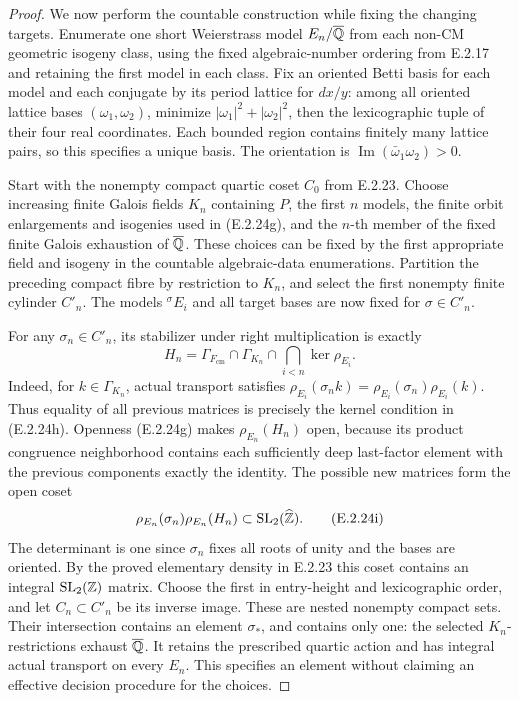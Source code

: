 \begin{proof}
We now perform the countable construction while fixing
the changing targets. Enumerate one short Weierstrass
model \(E_n/\overline{\mathbb Q}\) from each non-CM geometric isogeny
class, using the fixed algebraic-number ordering from
E.2.17 and retaining the first model in each class.
Fix an oriented Betti basis for each model and each
conjugate by its period lattice for \(dx/y\): among all
oriented lattice bases \((\omega_1,\omega_2)\), minimize
\(|\omega_1|^2+|\omega_2|^2\), then the lexicographic
tuple of their four real coordinates. Each bounded
region contains finitely many lattice pairs, so this
specifies a unique basis. The orientation is
\(\operatorname{Im}(\bar\omega_1\omega_2)>0\).

Start with the nonempty compact quartic coset \(C_0\)
from E.2.23. Choose increasing finite Galois fields
\(K_n\) containing \(P\), the first \(n\) models,
the finite orbit enlargements and isogenies used in
(E.2.24g), and the \(n\)-th member of the fixed finite
Galois exhaustion of \(\overline{\mathbb Q}\).
These choices can be fixed by the first appropriate
field and isogeny in the countable algebraic-data
enumerations. Partition the preceding compact fibre
by restriction to \(K_n\), and select the first
nonempty finite cylinder \(C'_n\).
The models \({}^{\sigma}E_i\) and all target bases
are now fixed for \(\sigma\in C'_n\).

For any \(\sigma_n\in C'_n\), its stabilizer under
right multiplication is exactly
\[
 H_n=\Gamma_{F_{\mathrm{cm}}}\cap\Gamma_{K_n}
                  \cap\bigcap_{i<n}\ker\rho_{E_i}.
 \tag{E.2.24h}
\]
Indeed, for \(k\in\Gamma_{K_n}\), actual transport
satisfies
\(\rho_{E_i}(\sigma_nk)=
\rho_{E_i}(\sigma_n)\rho_{E_i}(k)\).
Thus equality of all previous matrices is precisely
the kernel condition in (E.2.24h).
Openness (E.2.24g) makes \(\rho_{E_n}(H_n)\) open,
because its product congruence neighborhood contains
each sufficiently deep last-factor element with the
previous components exactly the identity.
The possible new matrices form the open coset
\[
 \rho_{E_n}(\sigma_n)\rho_{E_n}(H_n)
                \subset\operatorname{SL}_2(\widehat{\mathbb Z}).
 \tag{E.2.24i}
\]
The determinant is one since \(\sigma_n\) fixes all
roots of unity and the bases are oriented.
By the proved elementary density in E.2.23 this coset
contains an integral \(\operatorname{SL}_2(\mathbb Z)\)
matrix. Choose the first in entry-height and
lexicographic order, and let \(C_n\subset C'_n\)
be its inverse image. These are nested nonempty
compact sets. Their intersection contains an element
\(\sigma_*\), and contains only one: the selected
\(K_n\)-restrictions exhaust \(\overline{\mathbb Q}\).
It retains the prescribed quartic action and has
integral actual transport on every \(E_n\).
This specifies an element without claiming an
effective decision procedure for the choices.


\end{proof}
